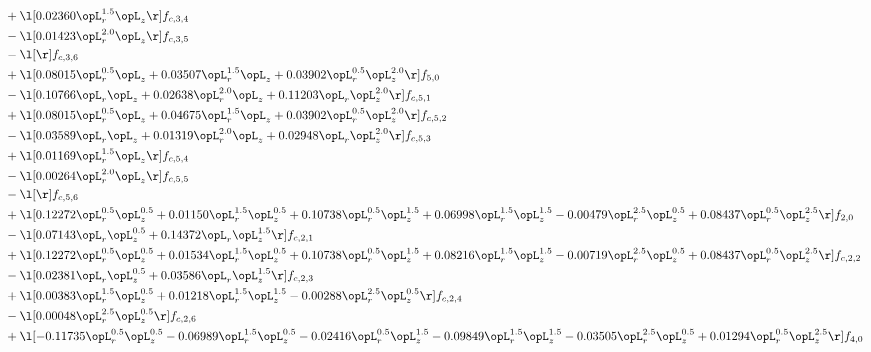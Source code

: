 \begin{alignat}{2}
& + \l[  0.02360 \opL_r^{1.5} \opL_z  \r] f_{c,3,4} \nonumber \\ 
& - \l[  0.01423 \opL_r^{2.0} \opL_z  \r] f_{c,3,5} \nonumber \\ 
& - \l[  \r] f_{c,3,6} \nonumber \\ 
& + \l[  0.08015 \opL_r^{0.5} \opL_z +  0.03507 \opL_r^{1.5} \opL_z +  0.03902 \opL_r^{0.5} \opL_z^{2.0}  \r] f_{5,0} \nonumber \\ 
& - \l[  0.10766 \opL_r \opL_z +  0.02638 \opL_r^{2.0} \opL_z +  0.11203 \opL_r \opL_z^{2.0}  \r] f_{c,5,1} \nonumber \\ 
& + \l[  0.08015 \opL_r^{0.5} \opL_z +  0.04675 \opL_r^{1.5} \opL_z +  0.03902 \opL_r^{0.5} \opL_z^{2.0}  \r] f_{c,5,2} \nonumber \\ 
& - \l[  0.03589 \opL_r \opL_z +  0.01319 \opL_r^{2.0} \opL_z +  0.02948 \opL_r \opL_z^{2.0}  \r] f_{c,5,3} \nonumber \\ 
& + \l[  0.01169 \opL_r^{1.5} \opL_z  \r] f_{c,5,4} \nonumber \\ 
& - \l[  0.00264 \opL_r^{2.0} \opL_z  \r] f_{c,5,5} \nonumber \\ 
& - \l[  \r] f_{c,5,6} \nonumber \\ 
& + \l[  0.12272 \opL_r^{0.5} \opL_z^{0.5} +  0.01150 \opL_r^{1.5} \opL_z^{0.5} +  0.10738 \opL_r^{0.5} \opL_z^{1.5} +  0.06998 \opL_r^{1.5} \opL_z^{1.5}   -0.00479 \opL_r^{2.5} \opL_z^{0.5} +  0.08437 \opL_r^{0.5} \opL_z^{2.5}  \r] f_{2,0} \nonumber \\ 
& - \l[  0.07143 \opL_r \opL_z^{0.5} +  0.14372 \opL_r \opL_z^{1.5}  \r] f_{c,2,1} \nonumber \\ 
& + \l[  0.12272 \opL_r^{0.5} \opL_z^{0.5} +  0.01534 \opL_r^{1.5} \opL_z^{0.5} +  0.10738 \opL_r^{0.5} \opL_z^{1.5} +  0.08216 \opL_r^{1.5} \opL_z^{1.5}   -0.00719 \opL_r^{2.5} \opL_z^{0.5} +  0.08437 \opL_r^{0.5} \opL_z^{2.5}  \r] f_{c,2,2} \nonumber \\ 
& - \l[  0.02381 \opL_r \opL_z^{0.5} +  0.03586 \opL_r \opL_z^{1.5}  \r] f_{c,2,3} \nonumber \\ 
& + \l[  0.00383 \opL_r^{1.5} \opL_z^{0.5} +  0.01218 \opL_r^{1.5} \opL_z^{1.5}   -0.00288 \opL_r^{2.5} \opL_z^{0.5}  \r] f_{c,2,4} \nonumber \\ 
& - \l[  0.00048 \opL_r^{2.5} \opL_z^{0.5}  \r] f_{c,2,6} \nonumber \\ 
& + \l[  -0.11735 \opL_r^{0.5} \opL_z^{0.5}   -0.06989 \opL_r^{1.5} \opL_z^{0.5}   -0.02416 \opL_r^{0.5} \opL_z^{1.5}   -0.09849 \opL_r^{1.5} \opL_z^{1.5}   -0.03505 \opL_r^{2.5} \opL_z^{0.5} +  0.01294 \opL_r^{0.5} \opL_z^{2.5}  \r] f_{4,0} \nonumber \\ 

\end{alignat}
